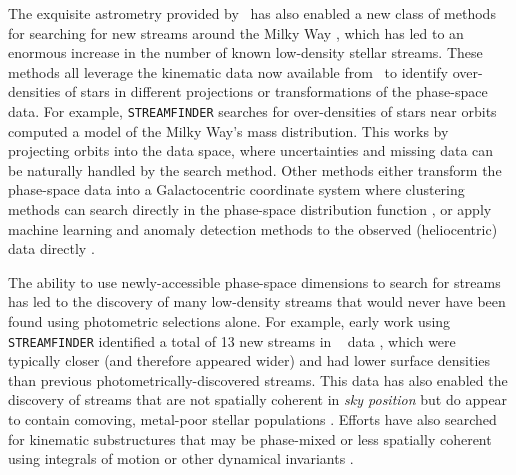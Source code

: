 \documentclass[final,5p,times,twocolumn,authoryear]{elsarticle}
\begin{document}
The exquisite astrometry provided by \gaia\ has also enabled a new class of methods for
searching for new streams around the Milky Way \citep[e.g.,][]{malhan:2018a,
borsato:2020, necib:2020, gatto:2020, shih:2022, shih:2023, pettee:2024}, which has led
to an enormous increase in the number of known low-density stellar streams.
These methods all leverage the kinematic data now available from \gaia\ to identify
over-densities of stars in different projections or transformations of the phase-space
data.
For example, \texttt{STREAMFINDER} \citep{malhan:2018a} searches for over-densities of
stars near orbits computed a model of the Milky Way's mass distribution.
This works by projecting orbits into the data space, where uncertainties and missing
data can be naturally handled by the search method.
Other methods either transform the phase-space data into a Galactocentric coordinate
system where clustering methods can search directly in the phase-space distribution
function \citep{necib:2020,gatto:2020}, or apply machine learning and anomaly detection
methods to the observed (heliocentric) data directly \citep{borsato:2020, shih:2022,
shih:2023, pettee:2024}.

The ability to use newly-accessible phase-space dimensions to search for streams has led
to the discovery of many low-density streams that would never have been found using
photometric selections alone.
For example, early work using \texttt{STREAMFINDER} identified a total of 13 new streams
in \gaia\  data \citep{malhan:2018, ibata:2018, ibata:2019}, which were typically
closer (and therefore appeared wider) and had lower surface densities than previous
photometrically-discovered streams.
This data has also enabled the discovery of streams that are not spatially coherent in
\emph{sky position} but do appear to contain comoving, metal-poor stellar populations
\citep[e.g.,][but see Section~\ref{sec:orbits} for more discussion of the origin of
the Nyx stream]{necib:2020b, balbinot:2023}.
Efforts have also searched for kinematic substructures that may be phase-mixed or less
spatially coherent using integrals of motion or other dynamical invariants
\citep[e.g.,][]{koppelman:2019b, yuan:2020, naidu:2020, ou:2023}.
\end{document}
